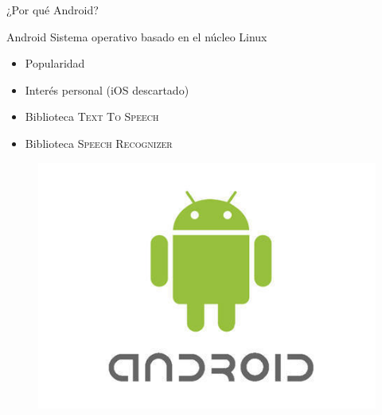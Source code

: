 \documentclass[10pt,xcolor=svgnames]{beamer}
\begin{document}
\begin{frame}{¿Por qué Android?}  
  \begin{block}{Android}
    Sistema operativo basado en el núcleo Linux
  \end{block}
  

  
  \begin{minipage}[t]{.6\textwidth}
    \vspace*{0.3cm}
    \begin{itemize}
    \item Popularidad
    \item Interés personal (iOS descartado)
    \item Biblioteca \textsc{Text To Speech}
    \item Biblioteca \textsc{Speech Recognizer}
    \end{itemize}
  \end{minipage}%
  \begin{minipage}[t]{.4\textwidth}    
    \begin{figure}[H]
      \centering
      \includegraphics[width=\textwidth]{./img/android-logo}
    \end{figure}
  \end{minipage}
\end{frame}
\end{document}
